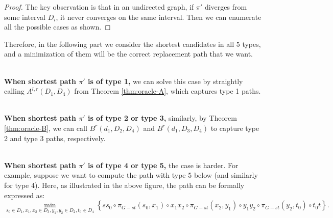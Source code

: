 \documentclass[11pt]{article}
\theoremstyle{plain}
\theoremstyle{definition}
\begin{document}
\begin{center}
 \end{center}

\begin{proof}
The key observation is that in an undirected graph, if $\pi'$ diverges from some interval $D_i$, it never converges on the same interval. Then we can enumerate all the possible cases as shown. 

\end{proof}

{
Therefore, in the following part we consider the shortest candidates in all 5 types, and a minimization of them will be the correct replacement path that we want.
}

~\\
\noindent\textbf{When shortest path $\pi'$ is of type 1,} we can solve this case by straightly calling $A^{l,r}(D_1,D_4)$ from Theorem \ref{thm:oracle-A}, which captures type 1 paths.





~\\
\noindent\textbf{When shortest path $\pi'$ is of type 2 or type 3,} similarly, by Theorem \ref{thm:oracle-B}, we can call $B^r(d_1,D_2,D_4)$ and $B^r(d_1,D_3,D_4)$ to capture type 2 and type 3 paths, respectively.



~\\
\noindent\textbf{When shortest path $\pi'$ is of type 4 or type 5,} the case is harder. For example, suppose we want to compute the path with type 5 below (and similarly for type 4). Here, as illustrated in the above figure, the path can be formally expressed as:
$$\min_{s_0\in D_1, x_1, x_2\in D_3, y_1, y_2\in D_2, t_0\in D_4} \left\{s s_0 \circ \pi_{G-st}(s_0, x_1) \circ x_1x_2 \circ \pi_{G-st}(x_2, y_1) \circ y_1y_2 \circ \pi_{G-st}(y_2, t_0) \circ t_0t \right\}. $$
\end{document}
